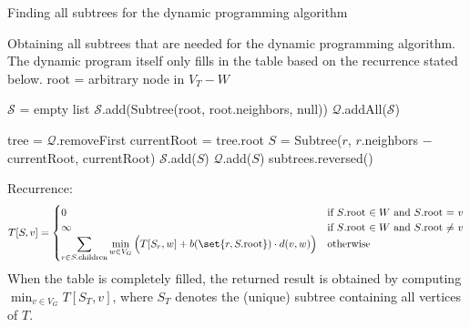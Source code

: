 \documentclass[language=english, number=1]{../lib/homework}
\begin{document}
    \begin{algorithm}
        \caption{Finding all subtrees for the dynamic programming algorithm}
        \label{alg:idk}
        \begin{algorithmic}[1]
            \Statex Obtaining all subtrees that are needed for the dynamic programming algorithm.
            The dynamic program itself only fills in the table based on the recurrence stated below.
                \State root = arbitrary node in $V_T - W$

                \State $\mathcal S$ = empty list
                \State $\mathcal S$.add(Subtree(root, root.neighbors, null)) 
                \State $\mathcal Q$.addAll($\mathcal S$)

                    \State tree = $\mathcal Q$.removeFirst
                    \State currentRoot = tree.root
                        \State $S$ = Subtree($r$, $r$.neighbors $-$ currentRoot, currentRoot)
                        \State $\mathcal S$.add($S$)
                        \State $\mathcal Q$.add($S$)
                    \EndFor
                \EndWhile
                \State \Return subtrees.reversed()
            \EndProcedure
        \end{algorithmic}
    \end{algorithm}

    Recurrence:
    \[
        T[S, v] = \begin{cases}
                      0 &\text{if $S$.root $\in W$ and $S$.root = $v$} \\
                      \infty &\text{if $S$.root $\in W$ and $S$.root $\neq$ $v$} \\
                      \displaystyle \sum_{r \in S.\text{children}} \min_{w \in V_G} \Big( T[S_r, w] + b(\set{r, S.\text{root}}) \cdot d(v, w) \Big) &\text{otherwise} \\
        \end{cases}
    \]
    When the table is completely filled, the returned result is obtained by computing $\min_{v \in V_G} T[S_T, v]$, where $S_T$ denotes the (unique) subtree containing all vertices of $T$.
\end{document}
